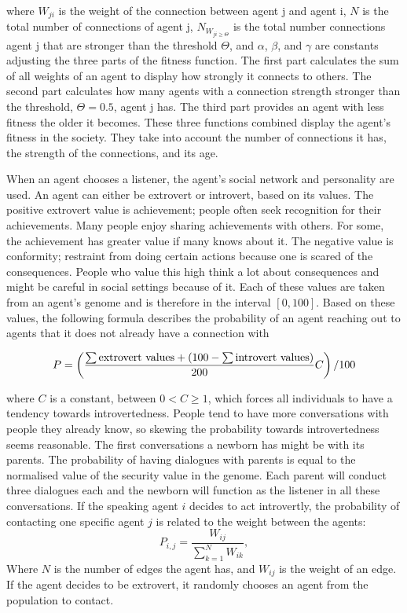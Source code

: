 where $W_{ji}$ is the weight of the connection between agent j and agent i, $N$ is the total number of connections of agent j, $ N_{W_{ji \geq \Theta}}$ is the total number connections agent j that are stronger than the threshold $\Theta$, and $\alpha$, $\beta$, and $\gamma$ are constants adjusting the three parts of the fitness function. The first part calculates the sum of all weights of an agent to display how strongly it connects to others. The second part calculates how many agents with a connection strength stronger than the threshold, $\Theta = 0.5$, agent j has. The third part provides an agent with less fitness the older it becomes. These three functions combined display the agent’s fitness in the society. They take into account the number of connections it has, the strength of the connections, and its age.

When an agent chooses a listener, the agent's social network and personality are used. An agent can either be extrovert or introvert, based on its values. The positive extrovert value is achievement; people often seek recognition for their achievements. Many people enjoy sharing achievements with others. For some, the achievement has greater value if many knows about it. The negative value is conformity; restraint from doing certain actions because one is scared of the consequences. People who value this high think a lot about consequences and might be careful in social settings because of it. Each of these values are taken from an agent’s genome and is therefore in the interval $[0, 100]$. Based on these values, the following formula describes the probability of an agent reaching out to agents that it does not already have a connection with

\begin{equation}\label{eq:chooseListener}
P = \left( \frac{\sum \text{extrovert values} + (100 - \sum \text{introvert values})}{200}C \right)/100
\end{equation}

where $C$ is a constant, between $0 < C \geq 1$, which forces all individuals to have a tendency towards introvertedness. People tend to have more conversations with people they already know, so skewing the probability towards introvertedness seems reasonable. The first conversations a newborn has might be with its parents. The probability of having dialogues with parents is equal to the normalised value of the security value in the genome. Each parent will conduct three dialogues each and the newborn will function as the listener in all these conversations. If the speaking agent $i$ decides to act introvertly, the probability of contacting one specific agent $j$ is related to the weight between the agents:
\begin{equation}\label{eq:intrvertListener}
P_{i,j} = \frac{W_{ij}}{\sum_{k=1}^{N}{W_{ik}}},
\end{equation}
Where $N$ is the number of edges the agent has, and $W_{ij}$ is the weight of an edge. If the agent decides to be extrovert, it randomly chooses an agent from the population to contact.

